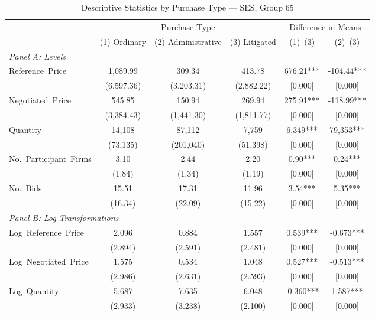 \begin{table}[ht]
  \centering
  \caption{Descriptive Statistics by Purchase Type --- SES, Group 65}
  \label{tab:desc_stats_ses_g65}
  \footnotesize
  \begin{threeparttable}
  \setlength{\tabcolsep}{4pt}
  \begin{tabular}{lccccc}
    \hline\hline
    & \multicolumn{3}{c}{Purchase Type} & \multicolumn{2}{c}{Difference in Means} \\
    \cmidrule(lr){2-4} \cmidrule(lr){5-6}
    & (1) Ordinary & (2) Administrative & (3) Litigated & (1)--(3) & (2)--(3) \\
    \hline
    \multicolumn{6}{l}{\textit{Panel A: Levels}} \\[3pt]
    Reference~Price & 1,089.99 & 309.34 & 413.78 & 676.21*** & -104.44*** \\
    & (6,597.36) & (3,203.31) & (2,882.22) & [0.000] & [0.000] \\[3pt]
    Negotiated~Price & 545.85 & 150.94 & 269.94 & 275.91*** & -118.99*** \\
    & (3,384.43) & (1,441.30) & (1,811.77) & [0.000] & [0.000] \\[3pt]
    Quantity & 14,108 & 87,112 & 7,759 & 6,349*** & 79,353*** \\
    & (73,135) & (201,040) & (51,398) & [0.000] & [0.000] \\[3pt]
    No.~Participant~Firms & 3.10 & 2.44 & 2.20 & 0.90*** & 0.24*** \\
    & (1.84) & (1.34) & (1.19) & [0.000] & [0.000] \\[3pt]
    No.~Bids & 15.51 & 17.31 & 11.96 & 3.54*** & 5.35*** \\
    & (16.34) & (22.09) & (15.22) & [0.000] & [0.000] \\[3pt]
    \hline
    \multicolumn{6}{l}{\textit{Panel B: Log Transformations}} \\[3pt]
    Log~Reference~Price & 2.096 & 0.884 & 1.557 & 0.539*** & -0.673*** \\
    & (2.894) & (2.591) & (2.481) & [0.000] & [0.000] \\[3pt]
    Log~Negotiated~Price & 1.575 & 0.534 & 1.048 & 0.527*** & -0.513*** \\
    & (2.986) & (2.631) & (2.593) & [0.000] & [0.000] \\[3pt]
    Log~Quantity & 5.687 & 7.635 & 6.048 & -0.360*** & 1.587*** \\
    & (2.933) & (3.238) & (2.100) & [0.000] & [0.000] \\[3pt]

\end{tabular}
\end{threeparttable}
\end{table}
